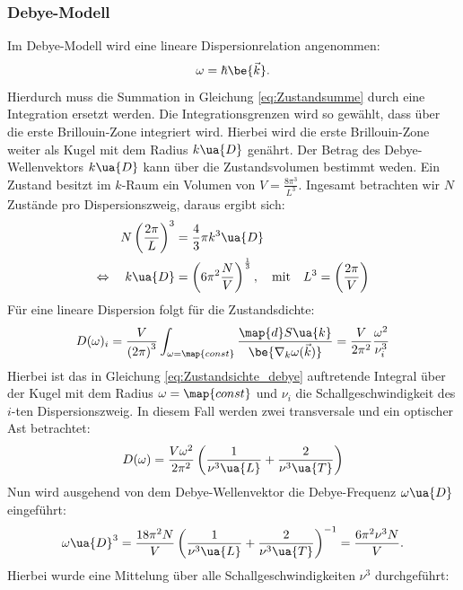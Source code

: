 \subsubsection{Debye-Modell}
Im Debye-Modell wird eine lineare Dispersionrelation angenommen:
\begin{equation*}
   \omega = \hbar \be{\vec{k}}.
\end{equation*}
Hierdurch muss die Summation in Gleichung \eqref{eq:Zustandsumme} durch eine
Integration ersetzt werden. Die Integrationsgrenzen wird so gewählt, dass über die
erste Brillouin-Zone integriert wird. Hierbei wird die erste Brillouin-Zone
weiter als Kugel mit dem Radius $k\ua{D}$ genährt. Der Betrag des Debye-Wellenvektors
$k\ua{D}$ kann über die Zustandsvolumen bestimmt weden. Ein Zustand besitzt im $k$-Raum
ein Volumen von $V=\frac{8\pi^3}{L^3}$. Ingesamt betrachten wir $N$ Zustände pro
Dispersionszweig, daraus ergibt sich:
\begin{align*}
  N\left(\frac{2\pi}{L}\right)^3 &= \frac{4}{3}\pi k^3\ua{D} \\
  \Leftrightarrow \quad k\ua{D}&=\left(6\pi^2 \frac{N}{V}\right)^{\frac{1}{3}}, \quad \text{mit} \quad L^3 = \left(\frac{2\pi}{V}\right)
\end{align*}
Für eine lineare Dispersion folgt für die Zustandsdichte:
\begin{equation}
  \label{eq:Zustandsichte_debye}
D(\omega)_i = \frac{V}{\left(2\pi\right)^3} \int_{\omega=\map{const}} \frac{\map{d}S\ua{k}}{\be{\nabla_k \omega(\vec{k})}}= \frac{V}{2\pi^2}\frac{\omega^2}{\nu_i^3}
\end{equation}
Hierbei ist das in Gleichung \eqref{eq:Zustandsichte_debye} auftretende Integral
über der Kugel mit dem Radius $\omega=\map{const}$ und $\nu_i$ die Schallgeschwindigkeit
des $i$-ten Dispersionszweig. In diesem Fall werden zwei transversale und ein optischer
Ast betrachtet:
\begin{equation}
  \label{eq:Zustandsdichte_all_togther}
  D(\omega) = \frac{V \omega^2}{2\pi^2} \left(\frac{1}{\nu^3\ua{L}} + \frac{2}{\nu^3\ua{T}}\right)
\end{equation}
Nun wird ausgehend von dem Debye-Wellenvektor die Debye-Frequenz $\omega\ua{D}$ eingeführt:
\begin{equation}
  \label{eq:Debye_freuqenz}
  \omega\ua{D}^3 = \frac{18 \pi^2 N}{V}\left(\frac{1}{\nu^3\ua{L}} + \frac{2}{\nu^3\ua{T}}\right)^{-1}=\frac{6\pi^2\nu^3N}{V}.
\end{equation}
Hierbei wurde eine Mittelung über alle Schallgeschwindigkeiten $\nu^3$ durchgeführt:
